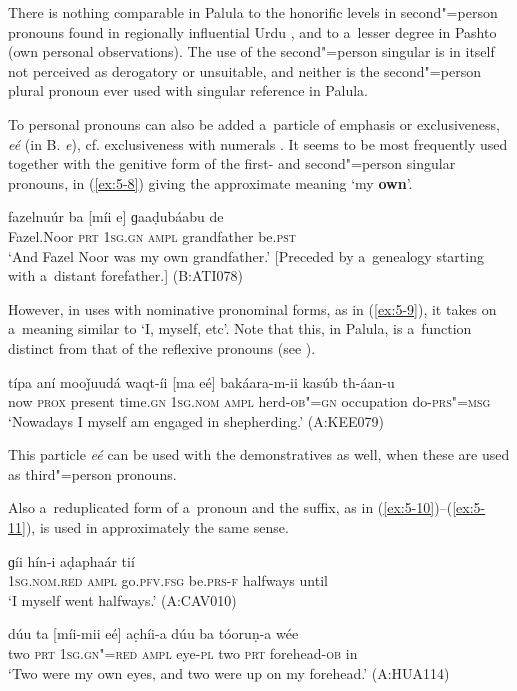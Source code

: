 There is nothing comparable in Palula to the honorific levels in second"=person pronouns found in regionally influential Urdu \citep[17]{schmidt1999}, and to a~lesser degree in Pashto (own personal observations). The use of the second"=person singular is in itself not perceived as derogatory or unsuitable, and neither is the second"=person plural pronoun ever used with singular reference in Palula.

To personal pronouns can also be added a~particle of emphasis or exclusiveness, \textit{eé} (in B. \textit{e}), cf. exclusiveness with numerals . It seems to be most frequently used together with the genitive form of the first- and second"=person singular pronouns, in (\ref{ex:5-8}) giving the approximate meaning `my \textbf{own}'.



\begin{exe}
\ex
\label{ex:5-8}
\gll fazelnuúr ba [míi e] ɡaaḍubáabu de \\
	Fazel.Noor \textsc{prt} \textsc{1sg.gn} \textsc{ampl} grandfather be.\textsc{pst} \\
\glt `And Fazel Noor was my own grandfather.' [Preceded by a~genealogy starting with a~distant forefather.] (B:ATI078)
\end{exe}

However, in uses with nominative pronominal forms, as in (\ref{ex:5-9}), it takes on a~meaning similar to `I, myself, etc'. Note that this, in Palula, is a~function distinct from that of the reflexive pronouns (see ).

\begin{exe}
\ex
\label{ex:5-9}
\gll típa aní mooǰuudá waqt-íi [ma eé] bakáara-m-ii kasúb th-áan-u\\
	now \textsc{prox} present time.\textsc{gn} \textsc{1sg.nom} \textsc{ampl} herd-\textsc{ob"=gn} occupation do-\textsc{prs"=msg}\\
\glt `Nowadays I myself am engaged in shepherding.' (A:KEE079)
\end{exe}

This particle \textit{eé} can be used with the demonstratives as well, when these are used as third"=person pronouns. 

Also a~reduplicated form of a~pronoun and the suffix, as in (\ref{ex:5-10})--(\ref{ex:5-11}), is used in approximately the same sense.


\begin{exe}
\ex
\label{ex:5-10}
\gll [mam eé] ɡíi hín-i aḍaphaár tií\\
\textsc{1sg.nom.red} \textsc{ampl} go.\textsc{pfv.fsg} be.\textsc{prs-f} halfways until \\
\glt `I myself went halfways.' (A:CAV010)

\ex
\label{ex:5-11}
\gll dúu ta [míi-mii eé] ac̣híi-a dúu ba tóoruṇ-a wée \\
	two \textsc{prt} \textsc{1sg.gn"=red} \textsc{ampl} eye-\textsc{pl} two \textsc{prt} forehead-\textsc{ob} in \\
\glt `Two were my own eyes, and two were up on my forehead.' (A:HUA114) 
\end{exe}

